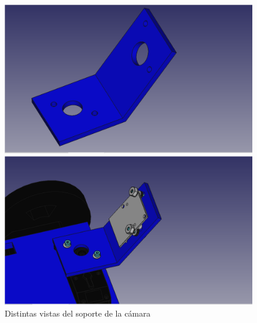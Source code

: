 \begin{figure}[ht!]
	\centering
	\begin{minipage}{0.45\linewidth}
		\centering
		\includegraphics[width=\linewidth]{figs/cap5/camera3sin.png}
	\end{minipage}
	\hspace{1cm}
	\begin{minipage}{0.45\linewidth}
		\centering
		\includegraphics[width=\linewidth]{figs/cap5/camera2con.png}
	\end{minipage}
	\caption{Distintas vistas del soporte de la cámara}
	\label{fig:pcamara}
\end{figure}

	
